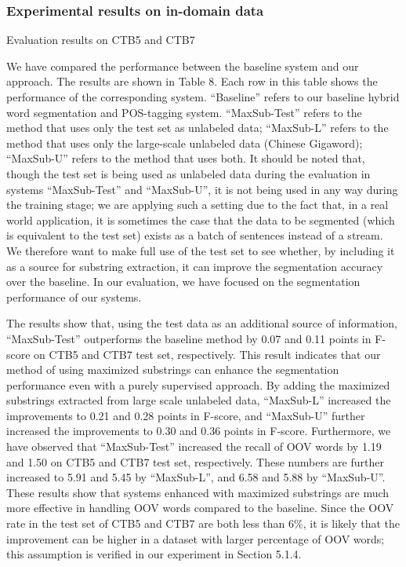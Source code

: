 \documentclass[english]{jnlp_1.4}
\begin{document}
\subsubsection{Experimental results on in-domain data}

\begin{table}[b]
\caption{Evaluation results on CTB5 and CTB7}

\end{table}

We have compared the performance between the baseline system and our approach. The results are shown in Table 8. Each row in this table shows the performance of the corresponding system. ``Baseline'' refers to our baseline hybrid word segmentation and POS-tagging system. ``MaxSub-Test'' refers to the method that uses only the test set as unlabeled data; ``MaxSub-L'' refers to the method that uses only the large-scale unlabeled data (Chinese Gigaword); ``MaxSub-U'' refers to the method that uses both. It should be noted that, though the test set is being used as unlabeled data during the evaluation in systems ``MaxSub-Test'' and ``MaxSub-U'', it is not being used in any way during the training stage; we are applying such a setting due to the fact that, in a real world application, it is sometimes the case that the data to be segmented (which is equivalent to the test set) exists as a batch of sentences instead of a stream. We therefore want to make full use of the test set to see whether, by including it as a source for substring extraction, it can improve the segmentation accuracy over the baseline. In our evaluation, we have focused on the segmentation performance of our systems.

The results show that, using the test data as an additional source of information, ``MaxSub-Test'' outperforms the baseline method by 0.07 and 0.11 points in F-score on CTB5 and CTB7 test set, respectively. This result indicates that our method of using maximized substrings can enhance the segmentation performance even with a purely supervised approach. By adding the maximized substrings extracted from large scale unlabeled data, ``MaxSub-L'' increased the improvements to 0.21 and 0.28 points in F-score, and ``MaxSub-U'' further increased the improvements to 0.30 and 0.36 points in F-score. Furthermore, we have observed that ``MaxSub-Test'' increased the recall of OOV words by 1.19 and 1.50 on CTB5 and CTB7 test set, respectively. These numbers are further increased to 5.91 and 5.45 by ``MaxSub-L'', and 6.58 and 5.88 by ``MaxSub-U''. These results show that systems enhanced with maximized substrings are much more effective in handling OOV words compared to the baseline. Since the OOV rate in the test set of CTB5 and CTB7 are both less than 6\%, it is likely that the improvement can be higher in a dataset with larger percentage of OOV words; this assumption is verified in our experiment in Section 5.1.4. 
\end{document}
